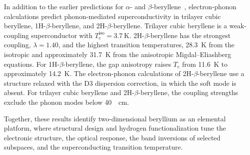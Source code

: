 In addition to the earlier predictions for $\alpha$- and $\beta$-beryllene~\cite{li2023coexistence},
electron-phonon calculations predict phonon-mediated superconductivity in trilayer cubic beryllene, 1H-$\beta$-beryllene, and 2H-$\beta$-beryllene.
Trilayer cubic beryllene is a weak-coupling superconductor with $T_\mathrm{c}^{\mathrm{iso}}=\qty{3.7}{\kelvin}$.
2H-$\beta$-beryllene has the strongest coupling, $\lambda=1.40$,
and the highest transition temperatures, \qty{28.3}{\kelvin} from the isotropic and approximately \qty{31.7}{\kelvin} from the anisotropic Migdal--Eliashberg equations.
For 1H-$\beta$-beryllene, the gap anisotropy raises $T_\mathrm{c}$ from \qty{11.6}{\kelvin} to approximately \qty{14.2}{\kelvin}.
The electron-phonon calculations of 2H-$\beta$-beryllene use a structure relaxed with the D3 dispersion correction,
in which the soft mode is absent.
For trilayer cubic beryllene and 2H-$\beta$-beryllene,
the coupling strengths exclude the phonon modes below \qty{40}{\per\centi\metre}.

Together,
these results identify two-dimensional beryllium as an elemental platform,
where structural design and hydrogen functionalization tune the electronic structure,
the optical response,
the band inversions of selected subspaces,
and the superconducting transition temperature.
